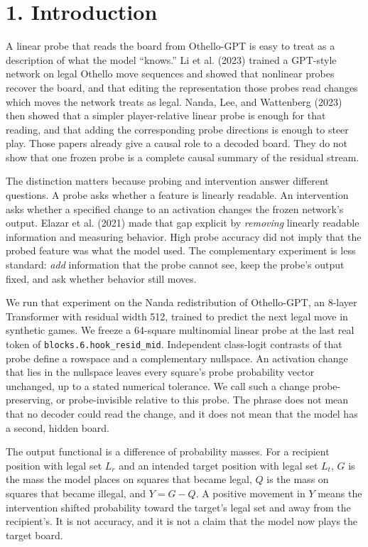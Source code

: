 \documentclass[11pt]{article}
\begin{document}
\section{1. Introduction}

A linear probe that reads the board from Othello-GPT is easy to treat as a description of what the model ``knows.'' Li et al. (2023) trained a GPT-style network on legal Othello move sequences and showed that nonlinear probes recover the board, and that editing the representation those probes read changes which moves the network treats as legal. Nanda, Lee, and Wattenberg (2023) then showed that a simpler player-relative linear probe is enough for that reading, and that adding the corresponding probe directions is enough to steer play. Those papers already give a causal role to a decoded board. They do not show that one frozen probe is a complete causal summary of the residual stream.

The distinction matters because probing and intervention answer different questions. A probe asks whether a feature is linearly readable. An intervention asks whether a specified change to an activation changes the frozen network's output. Elazar et al. (2021) made that gap explicit by \emph{removing} linearly readable information and measuring behavior. High probe accuracy did not imply that the probed feature was what the model used. The complementary experiment is less standard: \emph{add} information that the probe cannot see, keep the probe's output fixed, and ask whether behavior still moves.

We run that experiment on the Nanda redistribution of Othello-GPT, an 8-layer Transformer with residual width 512, trained to predict the next legal move in synthetic games. We freeze a 64-square multinomial linear probe at the last real token of \texttt{blocks.6.hook\_resid\_mid}. Independent class-logit contrasts of that probe define a rowspace and a complementary nullspace. An activation change that lies in the nullspace leaves every square's probe probability vector unchanged, up to a stated numerical tolerance. We call such a change probe-preserving, or probe-invisible relative to this probe. The phrase does not mean that no decoder could read the change, and it does not mean that the model has a second, hidden board.

The output functional is a difference of probability masses. For a recipient position with legal set \(L_r\) and an intended target position with legal set \(L_t\), \(G\) is the mass the model places on squares that became legal, \(Q\) is the mass on squares that became illegal, and \(Y=G-Q\). A positive movement in \(Y\) means the intervention shifted probability toward the target's legal set and away from the recipient's. It is not accuracy, and it is not a claim that the model now plays the target board.
\end{document}
